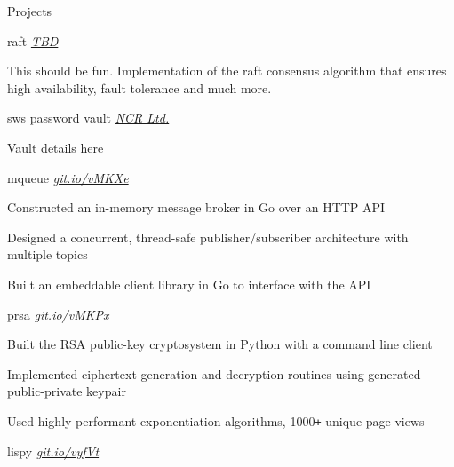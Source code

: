 \documentclass{resume} %
\begin{document}
\begin{rSection}{Projects}
  
  \begin{rSubsection}{raft}
	  {\em {\href{http://github.com/ridwanmsharif/mqueue}
		    {TBD}}}
	  {}
    \item This should be fun. Implementation of the raft consensus algorithm that ensures high availability, fault tolerance and much more.
  \end{rSubsection}

  \begin{rSubsection}{sws password vault}
	  {\em {\href{http://github.com/ridwanmsharif/mqueue}
		    {NCR Ltd.}}}
	  {}

    \item Vault details here
        
  \end{rSubsection}

  \begin{rSubsection}{mqueue}
	  {\em {\href{http://github.com/ridwanmsharif/mqueue}
		    {git.io/vMKXe}}}
	  {}

    \item Constructed an in-memory message broker in Go
			  over an HTTP API
    \item Designed a concurrent, thread-safe publisher/subscriber
		  architecture with multiple topics
    \item Built an embeddable client library in Go to interface with the API
        
  \end{rSubsection}

  \begin{rSubsection}{prsa}
	  {\em {\href{http://github.com/ridwanmsharif/prsa}
		    {git.io/vMKPx}}}
	  {}

    \item Built the RSA public-key cryptosystem in Python with a
			  command line client
    \item Implemented ciphertext generation and decryption routines using
		  generated public-private keypair
    \item Used highly performant exponentiation algorithms,
		  1000\texttt{+} unique page views
  \end{rSubsection}

  \begin{rSubsection}{lispy}
	  {\em {\href{http://github.com/ridwanmsharif/lispy}
		    {git.io/vyfVt}}}
	  {}


\end{rSubsection}
\end{rSection}
\end{document}
